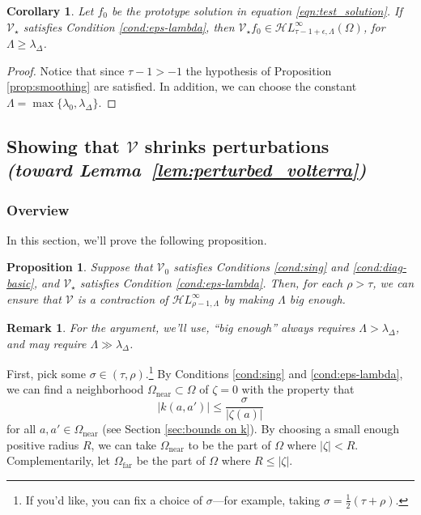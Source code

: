 \documentclass{article}
\theoremstyle{plain}
\newtheorem{prop}{Proposition}
\newtheorem{rmk}{Remark}
\newtheorem{cor}{Corollary}
\newcommand{\singexp}[2]{\mathcal{H}L^\infty_{#1, #2}}
\newcommand{\volterra}{\mathcal{V}}
\newcommand{\hardpart}{\mathcal{V}_0}
\newcommand{\softpart}{\mathcal{V}_\star}
\newcommand{\domain}{\Omega}
\newcommand{\near}{\Omega_\text{near}}
\newcommand{\far}{\Omega_\text{far}}
\begin{document}
\begin{cor}\label{cor:pertub_f0}
    Let $f_0$ be the prototype solution in equation \eqref{eqn:test_solution}. If $\softpart$ satisfies {\em Condition \eqref{cond:eps-lambda}}, then $\softpart f_0\in\singexp{\tau-1+\epsilon}{\Lambda}(\Omega)$, for $\Lambda\geq \lambda_\Delta$. 
\end{cor}
\begin{proof}
    Notice that since $\tau-1>-1$ the hypothesis of Proposition \ref{prop:smoothing} are satisfied. In addition, we can choose the constant $\Lambda=\max \{\lambda_0 , \lambda_\Delta\}$. 
\end{proof}

\subsection{Showing that $\volterra$ shrinks perturbations \\ \textit{(toward Lemma~\ref{lem:perturbed_volterra})}}\label{sec:V is a contraction}
\subsubsection{Overview}
In this section, we'll prove the following proposition. %

\begin{prop}\label{prop:get-contraction}
Suppose that $\hardpart$ satisfies {\em Conditions \eqref{cond:sing}} and \eqref{cond:diag-basic}, and $\softpart$ satisfies {\em Condition \eqref{cond:eps-lambda}}. Then, for each $\rho > \tau$, we can ensure that $\volterra$ is a contraction of $\singexp{\rho-1}{\Lambda}$ by making $\Lambda$ big enough.
\end{prop}
\begin{rmk}
For the argument, we'll use, ``big enough'' always requires $\Lambda > \lambda_\Delta$, and may require $\Lambda \gg \lambda_\Delta$.
\end{rmk}
First, pick some $\sigma \in (\tau, \rho)$.\footnote{If you'd like, you can fix a choice of $\sigma$---for example, taking $\sigma = \frac{1}{2}(\tau + \rho)$.} By Conditions \eqref{cond:sing} and \eqref{cond:eps-lambda}, we can find a neighborhood $\near \subset \domain$ of $\zeta = 0$ with the property that
\begin{equation}\label{near-limit}
|k(a, a')| \le \frac{\sigma}{|\zeta(a)|}
\end{equation}
for all $a, a' \in \near$ (see Section \ref{sec:bounds on k}). By choosing a small enough positive radius $R$, we can take $\near$ to be the part of $\domain$ where $|\zeta| < R$. Complementarily, let $\far$ be the part of $\domain$ where $R \le |\zeta|$.
\end{document}
